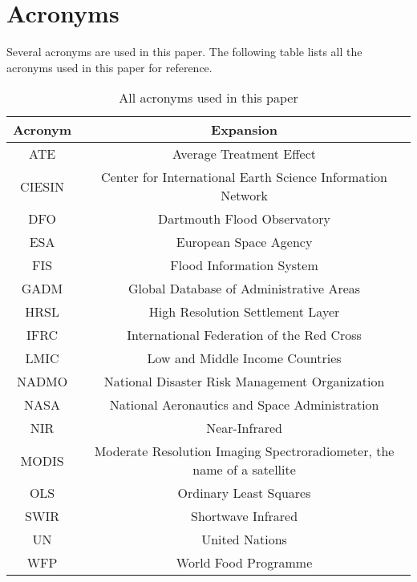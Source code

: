 \chapter{Acronyms}

Several acronyms are used in this paper. The following table lists all the acronyms used in this paper for reference.

\begin{table}
\centering
\begin{tabular}{|c|c|}
\hline
\textbf{Acronym} & \textbf{Expansion} \\
\hline
ATE & Average Treatment Effect \\
CIESIN & Center for International Earth Science Information Network \\
DFO & Dartmouth Flood Observatory \\
ESA & European Space Agency \\
FIS & Flood Information System \\ 
GADM  & Global Database of Administrative Areas \\
HRSL & High Resolution Settlement Layer \\
IFRC & International Federation of the Red Cross \\
LMIC & Low and Middle Income Countries \\
NADMO & National Disaster Risk Management Organization \\
NASA & National Aeronautics and Space Administration \\
NIR & Near-Infrared \\
MODIS & Moderate Resolution Imaging Spectroradiometer, the name of a satellite \\
OLS & Ordinary Least Squares \\
SWIR & Shortwave Infrared \\
UN & United Nations \\
WFP & World Food Programme \\

\hline
\end{tabular}
\caption{All acronyms used in this paper}
\end{table}

